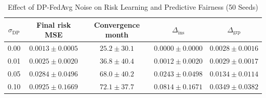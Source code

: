 \begin{table}[t]
\centering
\caption{Effect of DP-FedAvg Noise on Risk Learning and Predictive Fairness (50 Seeds)}
\label{tab:dp_impact}
\renewcommand{\arraystretch}{1.12}
\begin{tabular}{ccccc}
\toprule
$\sigma_{\mathrm{DP}}$ & Final risk MSE & Convergence month & $\Delta_{\mathrm{ins}}$ & $\Delta_{\mathrm{grp}}$ \\
\midrule
0.00 & $0.0013 \pm 0.0005$ & $25.2 \pm 30.1$ & $0.0000 \pm 0.0000$ & $0.0028 \pm 0.0016$ \\
0.01 & $0.0025 \pm 0.0020$ & $36.8 \pm 40.4$ & $0.0012 \pm 0.0020$ & $0.0029 \pm 0.0017$ \\
0.05 & $0.0284 \pm 0.0496$ & $68.0 \pm 40.2$ & $0.0243 \pm 0.0498$ & $0.0134 \pm 0.0114$ \\
0.10 & $0.0925 \pm 0.1669$ & $72.1 \pm 37.7$ & $0.0814 \pm 0.1671$ & $0.0349 \pm 0.0382$ \\
\bottomrule
\end{tabular}
\end{table}
